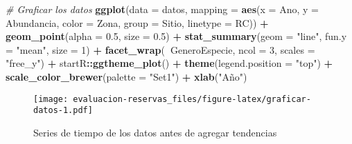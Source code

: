 \documentclass[]{krantz}
\newenvironment{Shaded}{\begin{snugshade}}{\end{snugshade}}
\newcommand{\CommentTok}[1]{\textcolor[rgb]{0.56,0.35,0.01}{\textit{#1}}}
\newcommand{\DataTypeTok}[1]{\textcolor[rgb]{0.13,0.29,0.53}{#1}}
\newcommand{\DecValTok}[1]{\textcolor[rgb]{0.00,0.00,0.81}{#1}}
\newcommand{\FloatTok}[1]{\textcolor[rgb]{0.00,0.00,0.81}{#1}}
\newcommand{\KeywordTok}[1]{\textcolor[rgb]{0.13,0.29,0.53}{\textbf{#1}}}
\newcommand{\NormalTok}[1]{#1}
\newcommand{\OperatorTok}[1]{\textcolor[rgb]{0.81,0.36,0.00}{\textbf{#1}}}
\newcommand{\StringTok}[1]{\textcolor[rgb]{0.31,0.60,0.02}{#1}}
\begin{document}
\begin{Shaded}
\begin{Highlighting}[]
\CommentTok{# Graficar los datos}
\KeywordTok{ggplot}\NormalTok{(}\DataTypeTok{data =}\NormalTok{ datos,}
       \DataTypeTok{mapping =} \KeywordTok{aes}\NormalTok{(}\DataTypeTok{x =}\NormalTok{ Ano, }\DataTypeTok{y =}\NormalTok{ Abundancia,}
                     \DataTypeTok{color =}\NormalTok{ Zona, }\DataTypeTok{group =}\NormalTok{ Sitio, }\DataTypeTok{linetype =}\NormalTok{ RC)) }\OperatorTok{+}
\StringTok{  }\KeywordTok{geom_point}\NormalTok{(}\DataTypeTok{alpha =} \FloatTok{0.5}\NormalTok{, }\DataTypeTok{size =} \FloatTok{0.5}\NormalTok{) }\OperatorTok{+}
\StringTok{  }\KeywordTok{stat_summary}\NormalTok{(}\DataTypeTok{geom =} \StringTok{"line"}\NormalTok{, }\DataTypeTok{fun.y =} \StringTok{"mean"}\NormalTok{, }\DataTypeTok{size =} \DecValTok{1}\NormalTok{) }\OperatorTok{+}
\StringTok{  }\KeywordTok{facet_wrap}\NormalTok{(}\OperatorTok{~}\NormalTok{GeneroEspecie, }\DataTypeTok{ncol =} \DecValTok{3}\NormalTok{, }\DataTypeTok{scales =} \StringTok{"free_y"}\NormalTok{) }\OperatorTok{+}
\StringTok{  }\NormalTok{startR}\OperatorTok{::}\KeywordTok{ggtheme_plot}\NormalTok{() }\OperatorTok{+}
\StringTok{  }\KeywordTok{theme}\NormalTok{(}\DataTypeTok{legend.position =} \StringTok{"top"}\NormalTok{) }\OperatorTok{+}
\StringTok{  }\KeywordTok{scale_color_brewer}\NormalTok{(}\DataTypeTok{palette =} \StringTok{"Set1"}\NormalTok{) }\OperatorTok{+}
\StringTok{  }\KeywordTok{xlab}\NormalTok{(}\StringTok{"Año"}\NormalTok{)}
\end{Highlighting}
\end{Shaded}

\begin{figure}
\centering
\texttt{[image: evaluacion-reservas\_files/figure-latex/graficar-datos-1.pdf]}
\caption{\label{fig:graficar-datos}Series de tiempo de los datos antes de
agregar tendencias}
\end{figure}
\end{document}
